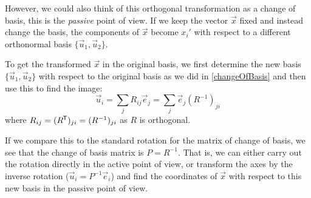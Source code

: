 \documentclass[../main.tex]{subfiles}
\begin{document}
However, we could also think of this orthogonal transformation as a change of basis, this is the \textit{passive} point of view.
If we keep the vector $\vec{x}$ fixed and instead change the basis, the components of $\vec{x}$ become $x_i'$ with respect to a different orthonormal basis $\{\vec{u}_1, \vec{u}_2\}$.
\begin{center}
\end{center}
To get the transformed $\vec{x}$ in the original basis, we first determine the new basis $\{\vec{u}_1, \vec{u}_2\}$ with respect to the original basis as we did in \cref{changeOfBasis} and then use this to find the image:
\[
  \vec{u}_i = \sum_{j} R_{i j}\vec{e}_j = \sum_{j} \vec{e}_j (R^{-1})_{j i}
\]
where $R_{i j} = (R^{{\mkern-1.5mu\mathsf{T}}})_{j i} = (R^{-1})_{j i}$ as $R$ is orthogonal.
\begin{remark}
  If we compare this to the standard rotation for the matrix of change of basis, we see that the change of basis matrix is $P = R^{-1}$.
  That is, we can either carry out the rotation directly in the active point of view, or transform the axes by the inverse rotation ($\vec{u}_i = P^{-1}\vec{e}_i$) and find the coordinates of $\vec{x}$ with respect to this new basis in the passive point of view.
\end{remark}
\end{document}
